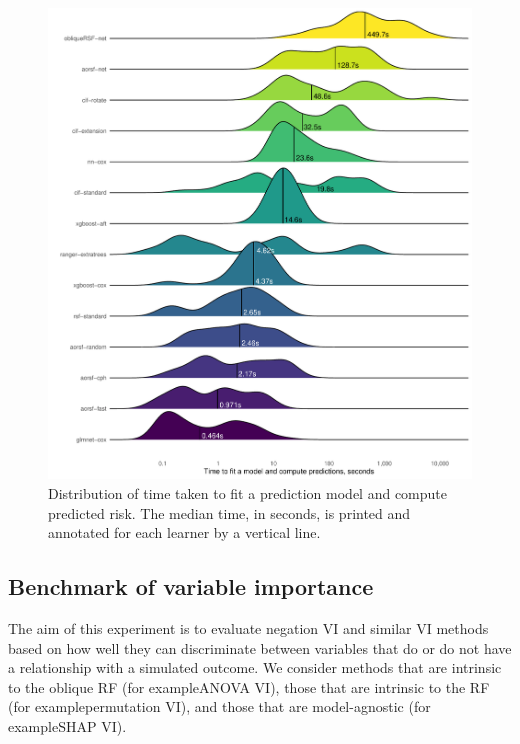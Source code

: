 \documentclass[twoside,11pt]{article}\usepackage[]{graphicx}\usepackage[]{xcolor}
\makeatletter
\def\maxwidth{ %
  \ifdim\Gin@nat@width>\linewidth
    \linewidth
  \else
    \Gin@nat@width
  \fi
}
\newenvironment{knitrout}{}{} %
\newcommand{\eg}{for example}
\makeatother
\begin{document}
\begin{knitrout}
\color{fgcolor}\begin{figure}
\includegraphics[width=\maxwidth]{figure/bm_pred_time-1} \caption[Distribution of time taken to fit a prediction model and compute predicted risk]{Distribution of time taken to fit a prediction model and compute predicted risk. The median time, in seconds, is printed and annotated for each learner by a vertical line.}\label{fig:bm_pred_time}
\end{figure}

\end{knitrout}


\subsection{Benchmark of variable importance}

The aim of this experiment is to evaluate negation VI and similar VI methods based on how well they can discriminate between variables that do or do not have a relationship with a simulated outcome. We consider methods that are intrinsic to the oblique RF (\eg ANOVA VI), those that are intrinsic to the RF (\eg permutation VI), and those that are model-agnostic (\eg SHAP VI).
\end{document}
